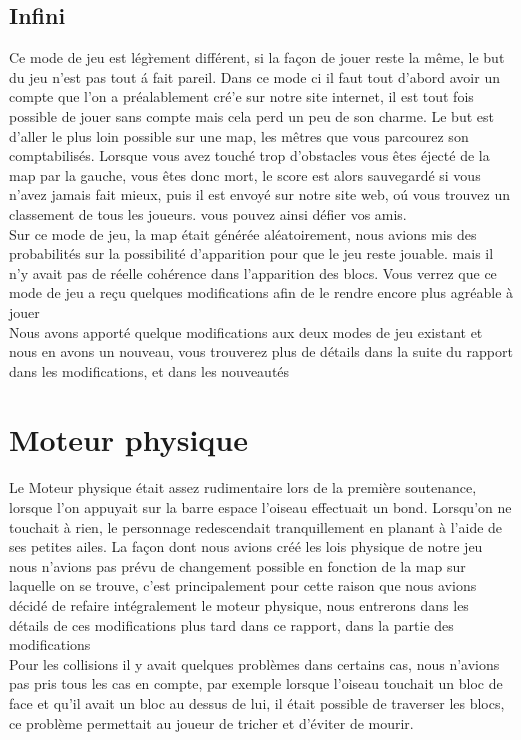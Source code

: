 \documentclass [11pt]{report}
\begin{document}
		\subsection{Infini}
			Ce mode de jeu est l\'eg\`rement diff\'erent, si la façon de jouer reste la m\^eme, le but du jeu n'est pas tout \'a fait pareil. Dans ce mode ci il faut tout d'abord avoir un compte que l'on a pr\'ealablement cr\'e'e sur notre site internet, il est tout fois possible de jouer sans compte mais cela perd un peu de son charme. Le but est d'aller le plus loin possible sur une map, les m\^etres que vous parcourez son comptabilis\'es. Lorsque vous avez touch\'e trop d'obstacles vous \^etes \'eject\'e de la map par la gauche, vous \^etes donc mort, le score est alors sauvegard\'e si vous n'avez jamais fait mieux, puis il est envoy\'e sur notre site web, o\'u vous trouvez un classement de tous les joueurs. vous pouvez ainsi d\'efier vos amis. \\
			\indent Sur ce mode de jeu, la map \'etait g\'en\'er\'ee al\'eatoirement, nous avions mis des probabilit\'es sur la possibilit\'e d'apparition pour que le jeu reste jouable. mais il n'y avait pas de r\'eelle coh\'erence dans l'apparition des blocs. Vous verrez que ce mode de jeu a reçu quelques modifications afin de le rendre encore plus agr\'eable \`a jouer\\
			\indent Nous avons apport\'e quelque modifications aux deux modes de jeu existant et nous en avons un nouveau, vous trouverez plus de d\'etails dans la suite du rapport dans les modifications, et dans les nouveaut\'es
	\section{Moteur physique}
		Le Moteur physique \'etait assez rudimentaire lors de la premi\`ere soutenance, lorsque l'on appuyait sur la barre espace l'oiseau effectuait un bond. Lorsqu'on ne touchait \`a rien, le personnage redescendait tranquillement en planant \`a l'aide de ses petites ailes. La façon dont nous avions cr\'e\'e les lois physique de notre jeu nous n'avions pas pr\'evu de changement possible en fonction de la map sur laquelle on se trouve, c'est principalement pour cette raison que nous avions d\'ecid\'e de refaire int\'egralement le moteur physique, nous entrerons dans les d\'etails de ces modifications plus tard dans ce rapport, dans la partie des modifications\\
		\indent Pour les collisions il y avait quelques probl\`emes dans certains cas, nous n'avions pas pris tous les cas en compte, par exemple lorsque l'oiseau touchait un bloc de face et qu'il avait un bloc au dessus de lui, il \'etait possible de traverser les blocs, ce probl\`eme permettait au joueur de tricher et d'\'eviter de mourir.
\end{document}
